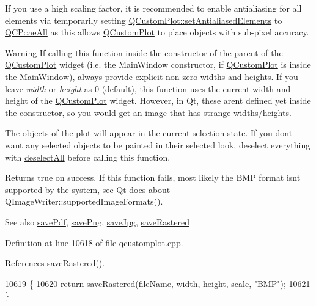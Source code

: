 If you use a high scaling factor, it is recommended to enable antialiasing for all elements via temporarily setting \hyperlink{class_q_custom_plot_af6f91e5eab1be85f67c556e98c3745e8}{Q\+Custom\+Plot\+::set\+Antialiased\+Elements} to \hyperlink{namespace_q_c_p_ae55dbe315d41fe80f29ba88100843a0caa897c232a0ffc8368e7c100ffc59ef31}{Q\+C\+P\+::ae\+All} as this allows \hyperlink{class_q_custom_plot}{Q\+Custom\+Plot} to place objects with sub-\/pixel accuracy.

\begin{DoxyWarning}{Warning}
If calling this function inside the constructor of the parent of the \hyperlink{class_q_custom_plot}{Q\+Custom\+Plot} widget (i.\+e. the Main\+Window constructor, if \hyperlink{class_q_custom_plot}{Q\+Custom\+Plot} is inside the Main\+Window), always provide explicit non-\/zero widths and heights. If you leave {\itshape width} or {\itshape height} as 0 (default), this function uses the current width and height of the \hyperlink{class_q_custom_plot}{Q\+Custom\+Plot} widget. However, in Qt, these aren\textquotesingle{}t defined yet inside the constructor, so you would get an image that has strange widths/heights.
\end{DoxyWarning}
The objects of the plot will appear in the current selection state. If you don\textquotesingle{}t want any selected objects to be painted in their selected look, deselect everything with \hyperlink{class_q_custom_plot_a9d4808ab925b003054085246c92a257c}{deselect\+All} before calling this function.

Returns true on success. If this function fails, most likely the B\+M\+P format isn\textquotesingle{}t supported by the system, see Qt docs about Q\+Image\+Writer\+::supported\+Image\+Formats().

\begin{DoxySeeAlso}{See also}
\hyperlink{class_q_custom_plot_a632da44c6d94ea8b271eb483b08b5114}{save\+Pdf}, \hyperlink{class_q_custom_plot_a7636261aff1f6d25c9da749ece3fc8b8}{save\+Png}, \hyperlink{class_q_custom_plot_a490c722092d1771e8ce4a7a73dfd84ab}{save\+Jpg}, \hyperlink{class_q_custom_plot_ab528b84cf92baabe29b1d0ef2f77c93e}{save\+Rastered} 
\end{DoxySeeAlso}


Definition at line 10618 of file qcustomplot.\+cpp.



References save\+Rastered().


\begin{DoxyCode}
10619 \{
10620   \textcolor{keywordflow}{return} \hyperlink{class_q_custom_plot_ab528b84cf92baabe29b1d0ef2f77c93e}{saveRastered}(fileName, width, height, scale, \textcolor{stringliteral}{"BMP"});
10621 \}
\end{DoxyCode}


